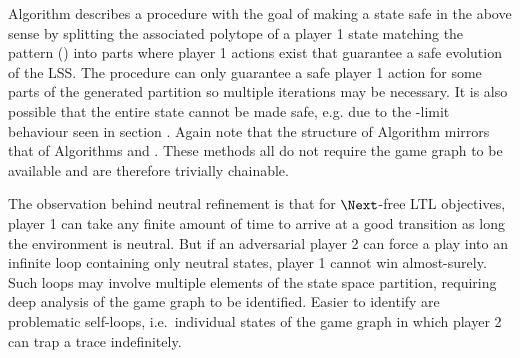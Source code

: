     Algorithm  describes a procedure with the goal of making a state safe in the above sense by splitting the associated polytope of a player 1 state matching the pattern () into parts where player 1 actions exist that guarantee a safe evolution of the LSS.
    The procedure can only guarantee a safe player 1 action for some parts of the generated partition so multiple iterations may be necessary.
    It is also possible that the entire state cannot be made safe, e.g. due to the \epsilon-limit behaviour seen in section .
    Again note that the structure of Algorithm  mirrors that of Algorithms  and .
    These methods all do not require the game graph to be available and are therefore trivially chainable.

\stopsubsection


    \startalgorithmic[numbering=no,margin=0em]
    \stopalgorithmic
    \startalgorithmic
                \ENDIF
            \ENDIF
        \ENDFOR
    \stopalgorithmic
\stopbuffer

\startsubsection[title={Loop Removal},reference={sec:refinement-holistic-loops}]


    The observation behind neutral refinement is that for $\Next$-free LTL objectives, player 1 can take any finite amount of time to arrive at a good transition as long the environment is neutral.
    But if an adversarial player 2 can force a play into an infinite loop containing only neutral states, player 1 cannot win almost-surely.
    Such loops may involve multiple elements of the state space partition, requiring deep analysis of the game graph to be identified.
    Easier to identify are problematic self-loops, i.e.\ individual states of the game graph in which player 2 can trap a trace indefinitely.

